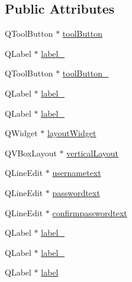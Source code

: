 \subsection*{Public Attributes}
\begin{DoxyCompactItemize}
\item 
Q\-Tool\-Button $\ast$ \hyperlink{classUi__NewUserSignup_a8986890bfaa033e0f7cd167fe2bbd078}{tool\-Button}
\item 
Q\-Label $\ast$ \hyperlink{classUi__NewUserSignup_a07df0dfdf88b5e6ba5674b0e1cb013a2}{label\-\_}
\item 
Q\-Tool\-Button $\ast$ \hyperlink{classUi__NewUserSignup_a0d72e06bcfa8a7ccb034598818920e06}{tool\-Button\-\_}
\item 
Q\-Label $\ast$ \hyperlink{classUi__NewUserSignup_af2d65afcc03d53b3e9f803132a5eeb98}{label\-\_}
\item 
Q\-Label $\ast$ \hyperlink{classUi__NewUserSignup_a256676778f02400e459fd9be78654a3c}{label\-\_}
\item 
Q\-Widget $\ast$ \hyperlink{classUi__NewUserSignup_af4d6efb8ed9416d75cd8b69e9d1cce0a}{layout\-Widget}
\item 
Q\-V\-Box\-Layout $\ast$ \hyperlink{classUi__NewUserSignup_aef74e92fd93855a252483d5b94b053da}{vertical\-Layout}
\item 
Q\-Line\-Edit $\ast$ \hyperlink{classUi__NewUserSignup_af19014fffa6b0072ca567d5d8b700056}{usernametext}
\item 
Q\-Line\-Edit $\ast$ \hyperlink{classUi__NewUserSignup_a34ccfd84e5ffd3619095dfd218ea13d9}{passwordtext}
\item 
Q\-Line\-Edit $\ast$ \hyperlink{classUi__NewUserSignup_ad2dc6efba8842a8ee00a1250b3da01c5}{confirmpasswordtext}
\item 
Q\-Label $\ast$ \hyperlink{classUi__NewUserSignup_a98d4c3eba23e7b0198acfc53ba33bf38}{label\-\_}
\item 
Q\-Label $\ast$ \hyperlink{classUi__NewUserSignup_aabe80337b0792454f09869e840bdf714}{label\-\_}
\item 
Q\-Label $\ast$ \hyperlink{classUi__NewUserSignup_ad0afab1ec9721aef3dcd9bcff64ebb20}{label}
\end{DoxyCompactItemize}


